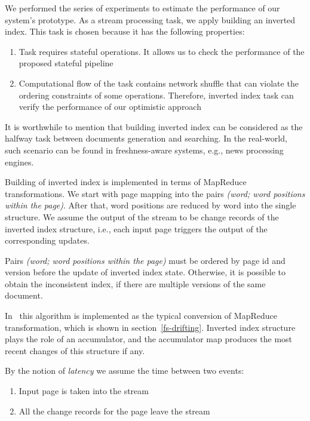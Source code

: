 
\label{fs-experiments-section}

We performed the series of experiments to estimate the performance of our system's prototype. As a stream processing task, we apply building an inverted index. This task is chosen because it has the following properties:

\begin{enumerate}
    \item Task requires stateful operations. It allows us to check the performance of the proposed stateful pipeline
    \item Computational flow of the task contains network shuffle that can violate the ordering constraints of some operations. Therefore, inverted index task can verify the performance of our optimistic approach
\end{enumerate}

It is worthwhile to mention that building inverted index can be considered as the halfway task between documents generation and searching. In the real-world, such scenario can be found in freshness-aware systems, e.g., news processing engines.

Building of inverted index is implemented in terms of MapReduce transformations. We start with page mapping into the pairs {\it (word; word positions within the page)}. After that, word positions are reduced by word into the single structure. We assume the output of the stream to be change records of the inverted index structure, i.e., each input page triggers the output of the corresponding updates. 

Pairs {\it (word; word positions within the page)} must be ordered by page id and version before the update of inverted index state. Otherwise, it is possible to obtain the inconsistent index, if there are multiple versions of the same document.  
 
In \FlameStream\ this algorithm is implemented as the typical conversion of MapReduce transformation, which is shown in section~\ref{fs-drifting}. Inverted index structure plays the role of an accumulator, and the accumulator map produces the most recent changes of this structure if any.

By the notion of {\it latency} we assume the time between two events: 

\begin{enumerate}
    \item Input page is taken into the stream
    \item All the change records for the page leave the stream
\end{enumerate}

